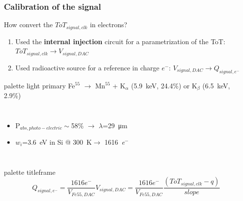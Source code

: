     \begin{frame}
        \frametitle{Calibration of the signal}
        How convert the $ToT_{signal, clk}$ in electrons?
        \smallskip
        \pause
        \begin{enumerate}
            \item Used the \textbf{internal injection} circuit for a parametrization of the ToT: $ToT_{signal,clk}\rightarrow V_{signal, DAC}$
            \item Used radioactive source for a reference in charge $e^-$: $V_{signal, DAC}\rightarrow Q_{signal, e^-}$
        \end{enumerate}
        \medskip
        \pause
        \begin{beamercolorbox}[sep=0em,wd=0.95\textwidth,ht=1.5ex, dp=0.1ex, rounded=true, center]{palette light primary}
            Fe$^{55}$ $\rightarrow$ Mn$^{55}$ + K$_\alpha$ (\SI{5.9}{keV}, 24.4\%) or K$_\beta$ (\SI{6.5}{keV}, 2.9\%)
        \end{beamercolorbox}
        \begin{columns}
            \begin{itemize}
                \item P$_{abs, photo-electric}\sim$58\% $\rightarrow$ $\lambda$=\SI{29}{\um}
                \item $w_i$=\SI{3.6}{eV} in Si @ \SI{300}{\kelvin}$\rightarrow$ \SI{1616}{\elementarycharge}$^-$
            \end{itemize}
        \end{columns}
        \medskip
        \pause
        \begin{beamercolorbox}[rounded=true, center]{palette titleframe}
        \begin{equation*}
            Q_{signal,e^-} = \frac{1616e^-}{V_{Fe55,DAC}}V_{signal,DAC}=\frac{1616e^-}{V_{Fe55,DAC}}\frac{(ToT_{signal,clk}-q)}{slope}
        \end{equation*}
    \end{beamercolorbox}
    \end{frame}  



